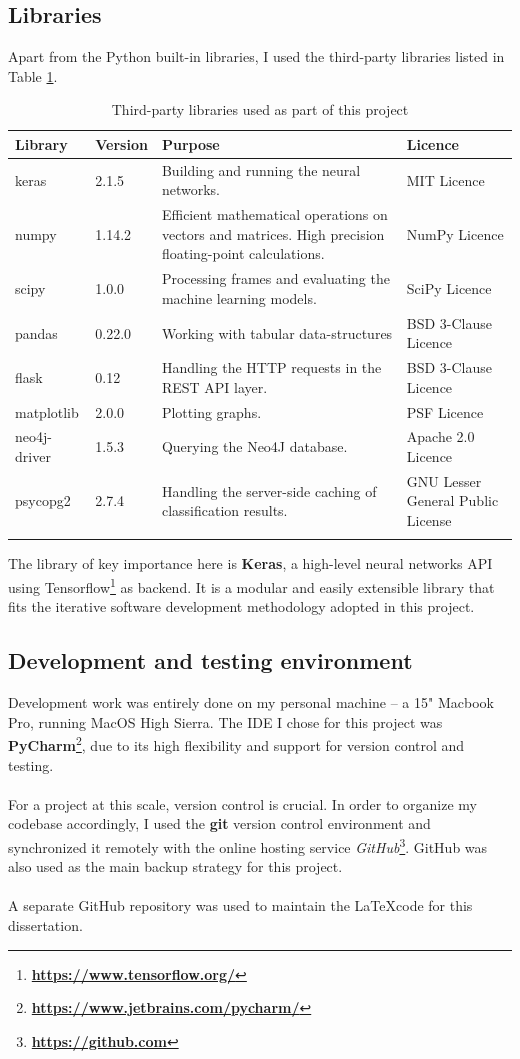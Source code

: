 	\subsection{Libraries} \label{Section 2.5.2}
	Apart from the Python built-in libraries, I used the third-party libraries listed in Table \ref{Table 2.3}. 
	\begin{longtable}{|p{} p{} p{} p{}|}
		\textbf{Library} & \textbf{Version} & \textbf{Purpose} & \textbf{Licence}\\
		\hline
		keras & 2.1.5 & Building and running the neural networks. & MIT Licence \\
		numpy & 1.14.2 & Efficient mathematical operations on vectors and matrices. High precision floating-point calculations. & NumPy Licence\\
		scipy & 1.0.0 & Processing frames and evaluating the machine learning models. & SciPy Licence\\
		pandas & 0.22.0 & Working with tabular data-structures & BSD 3-Clause Licence\\
		flask & 0.12 & Handling the HTTP requests in the REST API layer. & BSD 3-Clause Licence\\
		matplotlib & 2.0.0 & Plotting graphs. & PSF Licence \\
		neo4j-driver & 1.5.3 & Querying the Neo4J database. & Apache 2.0 Licence\\
		psycopg2 & 2.7.4 & Handling the server-side caching of classification results. &  GNU Lesser General Public License\\
		\hline
		\caption[Libaries table]{\centering Third-party libraries used as part of this project}
		\label{Table 2.3}
	\end{longtable} 
	The library of key importance here is \textbf{Keras}, a high-level neural networks API using Tensorflow\footnote{\textbf{\url{https://www.tensorflow.org/}}} as backend. It is a modular and easily extensible library that fits the iterative software development methodology adopted in this project.
	\subsection{Development and testing environment}
	Development work was entirely done on my personal machine -- a 15" Macbook Pro, running MacOS High Sierra. The IDE I chose for this project was \textbf{PyCharm}\footnote{\textbf{\url{https://www.jetbrains.com/pycharm/}}}, due to its high flexibility and support for version control and testing.
	\\ \\
	For a project at this scale, version control is crucial. In order to organize my codebase accordingly, I used the \textbf{git} version control environment and synchronized it remotely with the online hosting service \textit{GitHub}\footnote{\textbf{\url{https://github.com}}}. GitHub was also used as the main backup strategy for this project.
	\\ \\
	A separate GitHub repository was used to maintain the \LaTeX \space code for this dissertation. 
	

